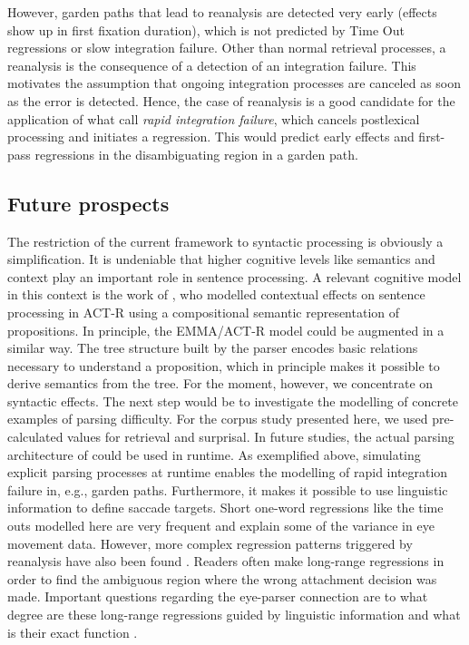 However, garden paths that lead to reanalysis are detected very early (effects show up in first fixation duration), which is not predicted by Time Out regressions or slow integration failure. 
Other than normal retrieval processes, a reanalysis is the consequence of a detection of an integration failure.  This motivates the assumption that ongoing integration processes are canceled as soon as the error is detected.  Hence, the case of reanalysis is a good candidate for the application of what \cite{Reichle1998} call  \emph{rapid integration failure}, which cancels postlexical processing and initiates a regression.  This would predict early effects and first-pass regressions in the disambiguating region in a garden path.

\subsection{Future prospects}
The restriction of the current framework to syntactic processing is obviously a simplification. It is undeniable that higher cognitive levels like semantics and context play an important role in sentence processing.  A relevant cognitive model in this context is the work of \cite{Budiu2004}, who modelled contextual effects on sentence processing in ACT-R using a compositional semantic representation of propositions. In principle, the EMMA/ACT-R model could be augmented in a similar way.
The tree structure built by the \cite{LewisVasishth2005} parser encodes basic relations necessary to understand a proposition, which in principle makes it possible to derive semantics from the tree. For the moment, however, we concentrate on syntactic effects.
The next step would be to investigate the modelling of concrete examples of parsing difficulty. For the corpus study presented here, we used pre-calculated values for retrieval and surprisal. In future studies, the actual parsing architecture of \cite{LewisVasishth2005} could be used in runtime.  As exemplified above, simulating explicit parsing processes at runtime enables the modelling of rapid integration failure in, e.g., garden paths. Furthermore, it makes it possible to use linguistic information to define saccade targets. Short one-word regressions like the time outs modelled here are very frequent and explain some of the variance in eye movement data.  However, more complex regression patterns triggered by reanalysis have also been found \citep[e.g.,][]{FrazierRayner1982,MalsburgVasishth2011,MalsburgVasishth2012,Meseguer2002}. Readers often make long-range regressions in order to find the ambiguous region where the wrong attachment decision was made. Important questions regarding the eye-parser connection are to what degree are these long-range regressions guided by linguistic information and what is their exact function \citep[e.g.,][]{Booth2013,Inhoff:2005p140,MitchellEtAl2008,Weger2007}.
